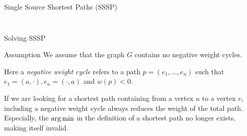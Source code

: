 \begin{frame}{Single Source Shortest Paths (SSSP)}
\begin{columns}
\begin{column}{0.8\textwidth}
\begin{figure}
            \end{figure}
        \end{column}
        \begin{column}{0.2\textwidth}
        \end{column}
    \end{columns}
\end{frame}

\begin{frame}{Solving SSSP}
    \begin{exampleblock}{Assumption}
        We assume that the graph $G$ contains no negative weight cycles.

        Here a \emph{negative weight cycle} refers to a path $p = (e_1, \dots, e_n)$ such that $e_1 = (a, \cdot), e_n = (\cdot, a)$ and $w(p) < 0$.

        If we are looking for a shortest path containing from a vertex $u$ to a vertex $v$, including a negative weight cycle always reduces the weight of the total path.
        Especially, the $\operatorname*{arg\,min}$ in the definition of a shortest path no longer exists, making itself invalid. \Lightning{}
    \end{exampleblock}
\end{frame}

